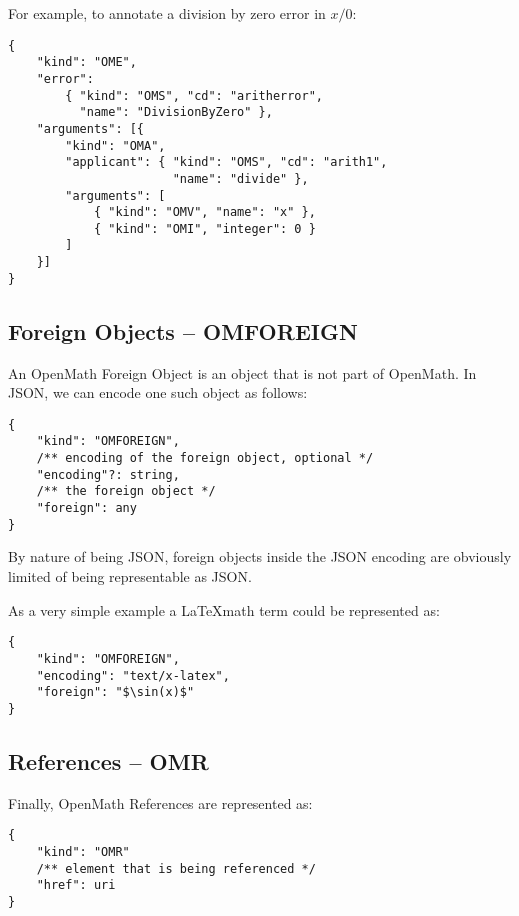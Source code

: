 For example, to annotate a division by zero error in $x/0$:
\\\begin{minipage}{\linewidth}
\begin{lstlisting}
{
    "kind": "OME",
    "error":
        { "kind": "OMS", "cd": "aritherror", 
          "name": "DivisionByZero" },
    "arguments": [{
        "kind": "OMA",
        "applicant": { "kind": "OMS", "cd": "arith1",
                       "name": "divide" },
        "arguments": [
            { "kind": "OMV", "name": "x" },
            { "kind": "OMI", "integer": 0 }
        ]
    }]
}
\end{lstlisting}\end{minipage}

\subsection{Foreign Objects -- OMFOREIGN}

An OpenMath Foreign Object is an object that is not part of OpenMath. 
In JSON, we can encode one such object as follows:
\\\begin{minipage}{\linewidth}
\begin{lstlisting}
{
    "kind": "OMFOREIGN",
    /** encoding of the foreign object, optional */
    "encoding"?: string,
    /** the foreign object */
    "foreign": any
}
\end{lstlisting}\end{minipage}

By nature of being JSON, foreign objects inside the JSON encoding are obviously limited of being representable as JSON. 

As a very simple example a \LaTeX math term could be represented as:
\\\begin{minipage}{\linewidth}
\begin{lstlisting}
{
    "kind": "OMFOREIGN",
    "encoding": "text/x-latex",
    "foreign": "$\sin(x)$"
}
\end{lstlisting}\end{minipage}

\subsection{References -- OMR}

Finally, OpenMath References are represented as:
\\\begin{minipage}{\linewidth}
\begin{lstlisting}
{
    "kind": "OMR"
    /** element that is being referenced */
    "href": uri
}
\end{lstlisting}\end{minipage}

